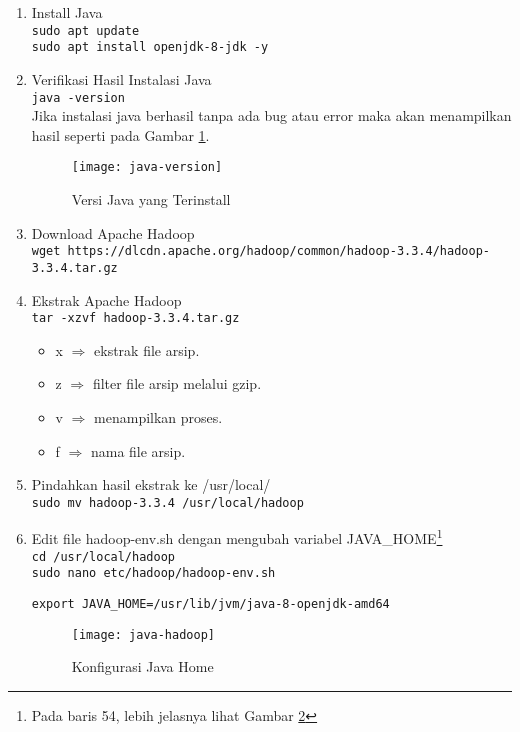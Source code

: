 \documentclass[a4paper]{tufte-handout}
\begin{document}
\begin{enumerate}
\item Install Java \\
{\tt sudo apt update} \\
{\tt sudo apt install openjdk-8-jdk -y} \\

\item Verifikasi Hasil Instalasi Java \\
{\tt java -version} \\
Jika instalasi java berhasil tanpa ada bug atau error maka akan menampilkan hasil seperti pada Gambar \ref{gam:java-version}.
\begin{figure}
\texttt{[image: java-version]}
\caption{Versi Java yang Terinstall}
\label{gam:java-version}
\end{figure}

\item Download Apache Hadoop \\
{\tt wget https://dlcdn.apache.org/hadoop/common/hadoop-3.3.4/hadoop-3.3.4.tar.gz}

\item Ekstrak Apache Hadoop \\
{\tt tar -xzvf hadoop-3.3.4.tar.gz }
\begin{itemize}
\item x $\Rightarrow$ ekstrak file arsip.
\item z $\Rightarrow$ filter file arsip melalui gzip.
\item v $\Rightarrow$ menampilkan proses.
\item f $\Rightarrow$ nama file arsip.
\end{itemize}

\item Pindahkan hasil ekstrak ke /usr/local/ \\
{\tt sudo mv hadoop-3.3.4 /usr/local/hadoop}

\item Edit file hadoop-env.sh dengan mengubah variabel JAVA\_HOME\footnote{Pada baris 54, lebih jelasnya lihat Gambar \ref{gam:java-hadoop}} \\
{\tt cd /usr/local/hadoop} \\
{\tt sudo nano etc/hadoop/hadoop-env.sh} \\
\begin{lstlisting}
export JAVA_HOME=/usr/lib/jvm/java-8-openjdk-amd64
\end{lstlisting}

\begin{figure}[!ht]
\centering
\texttt{[image: java-hadoop]}
\caption{Konfigurasi Java Home}
\label{gam:java-hadoop}
\end{figure}


\end{enumerate}
\end{document}
